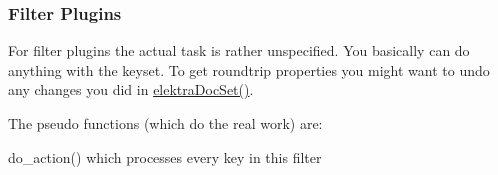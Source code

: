 \begin{DoxyCodeInclude}{0}
\DoxyCodeLine{        \{}
\DoxyCodeLine{        \}}
\end{DoxyCodeInclude}
 \hypertarget{group__plugin_filter}{}\subsubsection{Filter Plugins}\label{group__plugin_filter}
For filter plugins the actual task is rather unspecified. You basically can do anything with the keyset. To get roundtrip properties you might want to undo any changes you did in \mbox{\hyperlink{group__plugin_gae65781a1deb34efc79c8cb9d9174842c}{elektra\+Doc\+Set()}}.

The pseudo functions (which do the real work) are\+:
\begin{DoxyItemize}
\item do\+\_\+action() which processes every key in this filter
\end{DoxyItemize}


\begin{DoxyCodeInclude}{0}
\DoxyCodeLine{        \{}
\DoxyCodeLine{        \}}
\DoxyCodeLine{}
\DoxyCodeLine{\}}
\end{DoxyCodeInclude}


